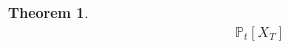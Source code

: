 \documentclass{article}
\newtheorem{thm}{Theorem}
\renewcommand{\P}[1]{\mathbb{P}_t\left[#1\right]}
\begin{document}
\begin{thm}
  \begin{eqnarray*}
    \P{X_T}
  \end{eqnarray*}
\end{thm}
\end{document}
